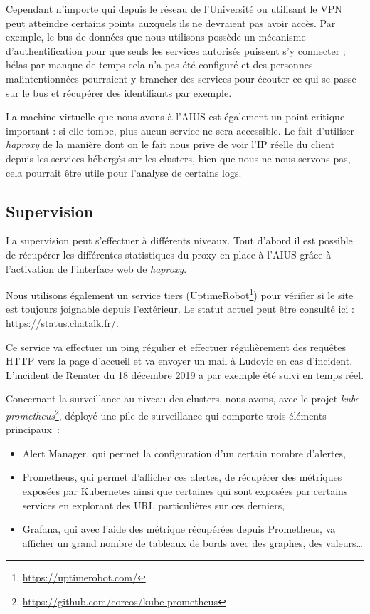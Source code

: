 Cependant n'importe qui depuis le réseau de l'Université ou utilisant le
VPN peut atteindre certains points auxquels ils ne devraient pas avoir
accès. Par exemple, le bus de données que nous utilisons possède un
mécanisme d'authentification pour que seuls les services autorisés
puissent s'y connecter ; hélas par manque de temps cela n'a pas été
configuré et des personnes malintentionnées pourraient y brancher des
services pour écouter ce qui se passe sur le bus et récupérer des
identifiants par exemple.

La machine virtuelle que nous avons à l'AIUS est également un point
critique important : si elle tombe, plus aucun service ne sera
accessible. Le fait d'utiliser \textit{haproxy} de la manière dont on le
fait nous prive de voir l'IP réelle du client depuis les services
hébergés sur les clusters, bien que nous ne nous servons pas, cela
pourrait être utile pour l'analyse de certains logs.

\subsection{Supervision}

La supervision peut s'effectuer à différents niveaux. Tout d'abord il
est possible de récupérer les différentes statistiques du proxy en place
à l'AIUS grâce à l'activation de l'interface web de \textit{haproxy}.

Nous utilisons également un service tiers
(UptimeRobot\footnote{\url{https://uptimerobot.com/}})
pour vérifier si le site est toujours joignable depuis l'extérieur. Le
statut actuel peut être consulté ici : \url{https://status.chatalk.fr/}.

Ce service va effectuer un ping régulier et effectuer régulièrement des
requêtes HTTP vers la page d'accueil et va envoyer un mail à Ludovic en
cas d'incident. L'incident de Renater du 18 décembre 2019 a par exemple
été suivi en temps réel.

Concernant la surveillance au niveau des clusters, nous avons, avec le
projet
\textit{kube-prometheus}\footnote{
  \url{https://github.com/coreos/kube-prometheus}},
déployé une pile de surveillance qui comporte trois éléments
principaux\ :

\begin{itemize}
\item
  Alert Manager, qui permet la configuration d'un certain nombre
  d'alertes,
\item
  Prometheus, qui permet d'afficher ces alertes, de récupérer des
  métriques exposées par Kubernetes ainsi que certaines qui sont
  exposées par certains services en explorant des URL particulières sur
  ces derniers,
\item
  Grafana, qui avec l'aide des métrique récupérées depuis Prometheus, va
  afficher un grand nombre de tableaux de bords avec des graphes, des
  valeurs\ldots{}
\end{itemize}

